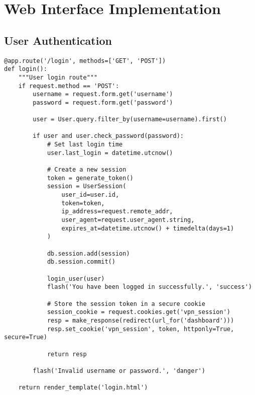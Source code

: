 \documentclass[12pt,a4paper]{report}
\begin{document}
\section{Web Interface Implementation}
\subsection{User Authentication}
\begin{lstlisting}[style=python, caption=User Authentication Implementation]
@app.route('/login', methods=['GET', 'POST'])
def login():
    """User login route"""
    if request.method == 'POST':
        username = request.form.get('username')
        password = request.form.get('password')
        
        user = User.query.filter_by(username=username).first()
        
        if user and user.check_password(password):
            # Set last login time
            user.last_login = datetime.utcnow()
            
            # Create a new session
            token = generate_token()
            session = UserSession(
                user_id=user.id,
                token=token,
                ip_address=request.remote_addr,
                user_agent=request.user_agent.string,
                expires_at=datetime.utcnow() + timedelta(days=1)
            )
            
            db.session.add(session)
            db.session.commit()
            
            login_user(user)
            flash('You have been logged in successfully.', 'success')
            
            # Store the session token in a secure cookie
            session_cookie = request.cookies.get('vpn_session')
            resp = make_response(redirect(url_for('dashboard')))
            resp.set_cookie('vpn_session', token, httponly=True, secure=True)
            
            return resp
            
        flash('Invalid username or password.', 'danger')
        
    return render_template('login.html')
\end{lstlisting}
\end{document}
